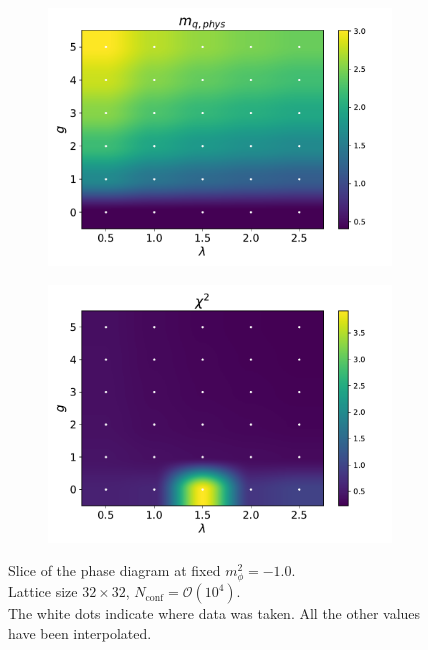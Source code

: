 \begin{figure}[htp]
\begin{subfigure}[b]{0.47\textwidth}
        \includegraphics[width=\textwidth]{figures/phase_diagram/g-lam/phase_diagram_mqphys.pdf}
    \end{subfigure}
    \begin{subfigure}[b]{0.47\textwidth}
        \includegraphics[width=\textwidth]{figures/phase_diagram/g-lam/phase_diagram_chi2.pdf}
    \end{subfigure}
    \caption[Phase diagram in the $\lambda-g$ plane]{Slice of the phase diagram at fixed $m_\phi^2 = -1.0$. \\ Lattice size $32 \times 32$, $N_\text{conf} = \mathcal{O}(10^4)$. \\ The white dots indicate where data was taken. All the other values have been interpolated.}
    \label{fig:phase_diagram_g_lam}
\end{figure} \newpage
